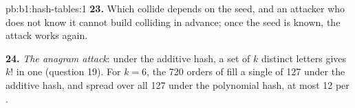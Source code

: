 \begin{solution}{pb:b1:hash-tables:1}
\textbf{23.} Which  collide depends on the seed, and an attacker who does not know it cannot build colliding  in
advance; once the seed is known, the attack works again.

\textbf{24.} \emph{The anagram attack}: under the additive hash, a set of $k$ distinct letters gives $k!$  in one
 (question 19). For $k = 6$, the 720 orders of  fill a single  of 127 under the additive hash,
and spread over all 127 under the polynomial hash, at most 12 per .
\end{solution}
